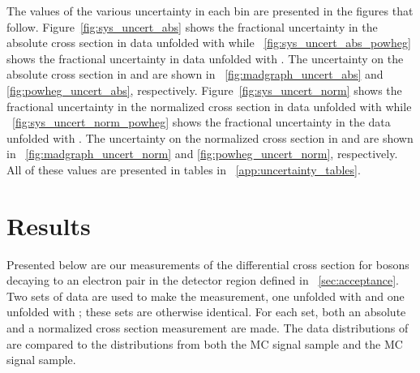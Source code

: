 The values of the various uncertainty in each \phistar bin are presented in the
figures that follow. Figure~\ref{fig:sys_uncert_abs} shows the fractional
uncertainty in the absolute \phistar cross section in data unfolded with
\MADGRAPH while \FIG~\ref{fig:sys_uncert_abs_powheg} shows the fractional
uncertainty in data unfolded with \POWHEG. The uncertainty on the absolute
\phistar cross section in \MADGRAPH and \POWHEG are shown in
\FIGS~\ref{fig:madgraph_uncert_abs} and \ref{fig:powheg_uncert_abs},
respectively. Figure~\ref{fig:sys_uncert_norm} shows the fractional uncertainty
in the normalized \phistar cross section in data unfolded with \MADGRAPH while
\FIG~\ref{fig:sys_uncert_norm_powheg} shows the fractional uncertainty in the
data unfolded with \POWHEG. The uncertainty on the normalized \phistar cross
section in \MADGRAPH and \POWHEG are shown in
\FIGS~\ref{fig:madgraph_uncert_norm} and \ref{fig:powheg_uncert_norm},
respectively. All of these values are presented in tables in
\APP~\ref{app:uncertainty_tables}.



















\section{Results}
\label{sec:results}

Presented below are our measurements of the differential \phistar cross section
for \Z bosons decaying to an electron pair in the detector region defined in
\SEC~\ref{sec:acceptance}. Two sets of data are used to make the measurement,
one unfolded with \MADGRAPH and one unfolded with \POWHEG; these sets are
otherwise identical. For each set, both an absolute and a normalized cross
section measurement are made. The data distributions of \phistar are compared
to the distributions from both the \MADGRAPH MC signal sample and the \POWHEG
MC signal sample.

